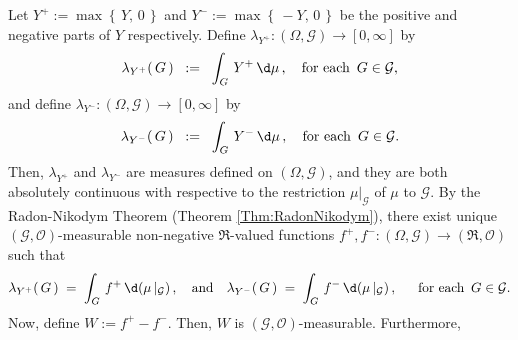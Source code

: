 \proof
Let $Y^{+} := \max\left\{\,Y,\,0\,\right\}$ and $Y^{-} := \max\left\{\,-Y,\,0\,\right\}$
be the positive and negative parts of $Y$ respectively.
Define $\lambda_{Y^{+}} : (\Omega,\mathcal{G}) \longrightarrow [0,\infty]$ by
\begin{equation*}
\lambda_{Y^{+}}(\,G\,) \;\; := \;\; \int_{G}\, Y^{+} \,\d\mu\,,
\quad
\textnormal{for each \,$G \in \mathcal{G}$},
\end{equation*}
and define $\lambda_{Y^{-}} : (\Omega,\mathcal{G}) \longrightarrow [0,\infty]$ by
\begin{equation*}
\lambda_{Y^{-}}(\,G\,) \;\; := \;\; \int_{G}\, Y^{-} \,\d\mu\,,
\quad
\textnormal{for each \,$G \in \mathcal{G}$}.
\end{equation*}
Then, $\lambda_{Y^{+}}$ and $\lambda_{Y^{-}}$ are measures defined on
$(\Omega,\mathcal{G})$, and they are both absolutely continuous with respective
to the restriction $\mu\vert_{\mathcal{G}}$ of $\mu$ to $\mathcal{G}$.
By the Radon-Nikodym Theorem (Theorem \ref{Thm:RadonNikodym}),
there exist unique $(\mathcal{G},\mathcal{O})$-measurable non-negative
$\Re$-valued functions
$f^{+}, f^{-} : (\Omega,\mathcal{G}) \longrightarrow (\Re,\mathcal{O})$
such that
\begin{equation*}
\lambda_{Y^{+}}(\,G\,) \;=\; \int_{G}\,f^{+}\,\d(\mu\,\vert_{\mathcal{G}})\,,
\quad\textnormal{and}\quad
\lambda_{Y^{-}}(\,G\,) \;=\; \int_{G}\,f^{-}\,\d(\mu\,\vert_{\mathcal{G}})\,,
\quad\;\;
\textnormal{for each \,$G \in \mathcal{G}$}.
\end{equation*}
Now, define $W := f^{+} - f^{-}$.
Then, $W$ is $(\mathcal{G},\mathcal{O})$-measurable.
Furthermore,
